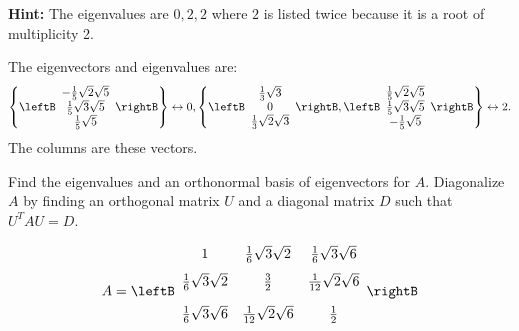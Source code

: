 \begin{enumialphparenastyle}
\begin{ex}
\textbf{Hint: }The eigenvalues are $0,2,2$ where $2$ is listed twice because
it is a root of multiplicity 2.
\begin{sol}
The eigenvectors and eigenvalues are:
\[
\left\{ \leftB
\begin{array}{c}
-\frac{1}{5}\sqrt{2}\sqrt{5} \\
\frac{1}{5}\sqrt{3}\sqrt{5} \\
\frac{1}{5}\sqrt{5}
\end{array}
\rightB \right\} \leftrightarrow 0,\left\{ \leftB
\begin{array}{c}
\frac{1}{3}\sqrt{3} \\
0 \\
\frac{1}{3}\sqrt{2}\sqrt{3}%
\end{array}
\rightB ,\leftB
\begin{array}{c}
\frac{1}{5}\sqrt{2}\sqrt{5} \\
\frac{1}{5}\sqrt{3}\sqrt{5} \\
-\frac{1}{5}\sqrt{5}
\end{array}
\rightB \right\} \leftrightarrow 2.
\]
The columns are these vectors.
\end{sol}
\end{ex}



\begin{ex} Find the eigenvalues and an orthonormal basis of eigenvectors for $A.$
Diagonalize $A$ by finding an orthogonal matrix $U$ and a diagonal matrix $D$
such that $U^{T}AU=D$.

\begin{equation*}
A=\leftB 
\begin{array}{ccc}
1 & \vspace{0.05in}\frac{1}{6}\sqrt{3}\sqrt{2} & \vspace{0.05in}\frac{1}{6}
\sqrt{3}\sqrt{6} \\ 
\vspace{0.05in}\frac{1}{6}\sqrt{3}\sqrt{2} & \vspace{0.05in}\frac{3}{2} & 
\vspace{0.05in}\frac{1}{12}\sqrt{2}\sqrt{6} \\ 
\vspace{0.05in}\frac{1}{6}\sqrt{3}\sqrt{6} & \vspace{0.05in}\frac{1}{12}
\sqrt{2}\sqrt{6} & \vspace{0.05in}\frac{1}{2}
\end{array}
\rightB
\end{equation*}


\end{ex}
\end{enumialphparenastyle}
